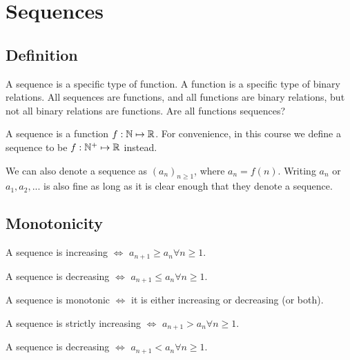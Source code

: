 \chapter{Sequences}


\section{Definition}
A sequence is a specific type of function. A function is a specific type of binary relations. All sequences are functions, and all functions are binary relations, but not all binary relations are functions. Are all functions sequences?
\begin{definition}
  A sequence is a function $f:\mathbb{N}\mapsto\mathbb{R}$. For convenience, in this course we define a sequence to be $f:\mathbb{N}^+\mapsto\mathbb{R}$ instead.
\end{definition}
\begin{notation}
  We can also denote a sequence as $(a_n)_{n\geq 1}$, where $a_n = f(n)$. Writing $a_n$ or $a_1, a_2, ...$ is also fine as long as it is clear enough that they denote a sequence.
\end{notation}


\section{Monotonicity}
\begin{definition}
  A sequence is increasing $\iff$ $a_{n+1}\geq a_n\forall n\geq 1$.
\end{definition}
\begin{definition}
  A sequence is decreasing $\iff$ $a_{n+1}\leq a_n\forall n\geq 1$.
\end{definition}
\begin{definition}
  A sequence is monotonic $\iff$ it is either increasing or decreasing (or both).
\end{definition}
\begin{definition}
  A sequence is strictly increasing $\iff$ $a_{n+1}>a_n\forall n\geq 1$.
\end{definition}
\begin{definition}
  A sequence is decreasing $\iff$ $a_{n+1}<a_n\forall n\geq 1$.
\end{definition}


